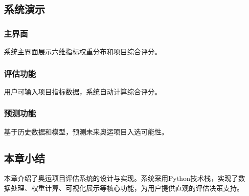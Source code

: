 \subsection{系统演示}

\subsubsection{主界面}

系统主界面展示六维指标权重分布和项目综合评分。

\subsubsection{评估功能}

用户可输入项目指标数据，系统自动计算综合评分。

\subsubsection{预测功能}

基于历史数据和模型，预测未来奥运项目入选可能性。

\subsection{本章小结}

本章介绍了奥运项目评估系统的设计与实现。系统采用Python技术栈，实现了数据处理、权重计算、可视化展示等核心功能，为用户提供直观的评估决策支持。